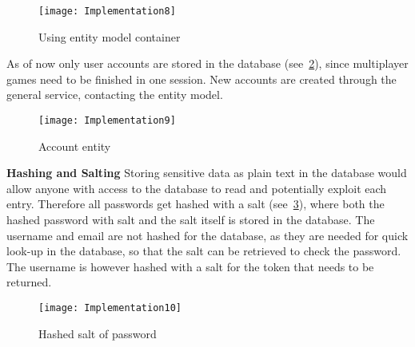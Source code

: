 \begin{figure}[h]
\centerline{\texttt{[image: Implementation8]}}
\caption {Using entity model container}
\label {fig:implementation8}
\end{figure}

As of now only user accounts are stored in the database
(see~\ref{fig:implementation9}), since multiplayer games need to be
 finished in one session. New accounts are created through the general
  service, contacting the entity model.

\begin{figure}[h]
\centerline{\texttt{[image: Implementation9]}}
\caption {Account entity}
\label {fig:implementation9}
\end{figure}

\textbf {Hashing and Salting}
Storing sensitive data as plain text in the database would allow
anyone with access to the database to read and potentially exploit
each entry. Therefore all passwords get hashed with a
salt (see~\ref{fig:implementation10}), where both the hashed password with
 salt and the salt itself is stored in the database. The username and email
  are not hashed for the database, as they are needed for quick look-up in
   the database, so that the salt can be retrieved to check the password.
    The username is however hashed with a salt for the token that needs to
     be returned.

\begin{figure}[h]
\centerline{\texttt{[image: Implementation10]}}
\caption {Hashed salt of password}
\label {fig:implementation10}
\end{figure}
